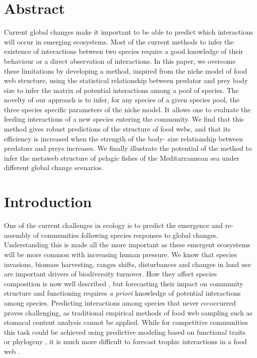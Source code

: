 \documentclass[12pt]{article}
\begin{document}
\section*{Abstract}
Current global changes make it important to be able to predict which
interactions will occur in emerging ecosystems. Most of the current methods to
infer the existence of interactions between two species require a good
knowledge of their behaviour or a direct observation of interactions. In this paper, we
overcome these limitations by developing a method, inspired from the niche
model of food web structure, using the statistical relationship between predator and prey body size to infer the matrix of potential interactions among a pool of species. 
The novelty of our approach is to infer, for any species of a given species pool, the three species specific parameters of the niche model. It allows one to evaluate the feeding interactions of a new species entering the community. We find that this method gives robust predictions of the structure of
food webs, and that its efficiency is increased when the strength of the body-
size relationship between predators and preys increases. We finally illustrate the potential of the method to infer the metaweb structure of pelagic fishes of the Meditarrannean sea under different global change scenarios.
\newpage

\section{Introduction}
One of the current challenges in ecology is to predict the emergence and re-assembly of communities following species responses to global changes. Understanding this is made all the more important as these emergent ecosystems will be more common with increasing human pressure. We know that species invasions, biomass harvesting, ranges shifts, disturbances and changes in land use are important drivers of biodiversity turnover. How they affect species composition is now well described \parencite{Pereira2010}, but forecasting their impact on community structure and functioning requires \emph{a priori} knowledge of potential interactions among species. Predicting interactions among species that never co-occurred proves challenging, as traditional empirical methods of food web sampling such as stomacal content analysis cannot be applied. While for competitive communities this task could be achieved using predictive modeling based on functional traits \parencite{McGill2006, Albouy2010} or phylogeny \parencite{Cavender-Bares2009, Mouquet2012} , it is much more difficult to forecast trophic interactions in a food web \parencite{Ings2009, Tylianakis2008,Montoya2010}.
\end{document}
